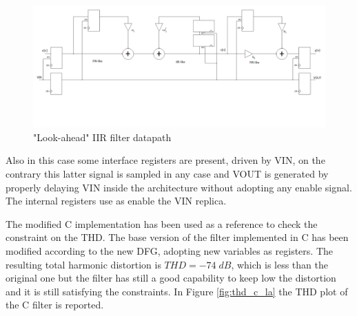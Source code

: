 \documentclass[a4paper, titlepage]{article}
\begin{document}
 \begin{figure} [h]
\centering
	\includegraphics[scale=0.3]{filter_la.png}
	\caption{"Look-ahead" IIR filter datapath}
	\label{fig:la_filt}
\end{figure}
\noindent Also in this case some interface registers are present, driven by VIN, on the contrary this latter signal is sampled in any case and VOUT is generated by properly delaying VIN inside the architecture without adopting any enable signal. The internal registers use as enable the VIN replica.

\noindent
The modified C implementation has been used as a reference to check the constraint on the THD. The base version of the filter implemented in C has been modified according to the new DFG, adopting new variables as registers. The resulting total harmonic distortion is $THD=-74\; dB$, which is less than the original one but the filter has still a good capability to keep low the distortion and it is still satisfying the constraints. In Figure \ref{fig:thd_c_la}
the THD plot of the C filter is reported.
\end{document}
